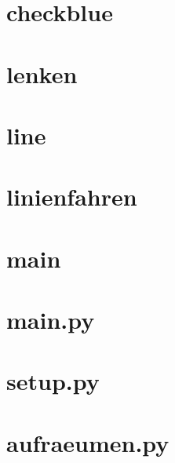\documentclass[a4paper, 12pt]{scrartcl}
\begin{document}
\section{checkblue}


\section{lenken}


\section{line}


\section{linienfahren}


\section{main}


\section{main.py}


\section{setup.py}


\section{aufraeumen.py}

\end{document}
